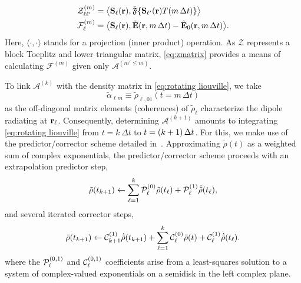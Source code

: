 \begin{subequations}
  \begin{align}
    \mathcal{Z}^{(m)}_{\ell \ell'} &= \big\langle \mathbf{S}_\ell(\vb{r}), \tilde{\mathfrak{F}}\{ \mathbf{S}_{\ell'}(\mathbf{r}) T(m \, \Delta t) \} \big\rangle \\
    \mathcal{F}^{(m)}_\ell &= \big\langle \mathbf{S}_\ell(\vb{r}), \tilde{\mathbf{E}}(\vb{r}, m \, \Delta t) - \tilde{\mathbf{E}}_0(\vb{r}, m \, \Delta t) \big\rangle.
  \end{align}
  \label{eq:projections}
\end{subequations}
Here, $\langle \cdot, \cdot \rangle$ stands for a projection (inner product) operation.
As $\mathcal{Z}$ represents a block Toeplitz and lower triangular matrix, \cref{eq:zmatrix} provides a means of calculating $\mathcal{F}^{(m)}$ given only $\mathcal{A}^{(m' \le m)}$.

To link $\mathcal{A}^{(k)}$ with the density matrix in \cref{eq:rotating liouville}, we take
\begin{equation}
  \tilde{\alpha}_{\ell m} \equiv \tilde{\rho}_{\ell, 01}(t = m \, \Delta t)
  \label{eq:polarization definition}
\end{equation}
as the off-diagonal matrix elements (coherences) of $\tilde{\rho}_{\ell}$ characterize the dipole radiating at $\vb{r}_\ell$.
Consequently, determining $\mathcal{A}^{(k + 1)}$ amounts to integrating \cref{eq:rotating liouville} from $t = k \, \Delta t$ to $t = \qty(k + 1) \, \Delta t$.
For this, we make use of the predictor/corrector scheme detailed in~\cite{Glaser2009}.
Approximating $\tilde{\rho}(t)$ as a weighted sum of complex exponentials, the predictor/corrector scheme proceeds with an extrapolation predictor step,
\begin{equation}
  \tilde{\rho}(t_{k + 1}) \leftarrow \sum_{\ell = 1}^k \mathcal{P}_\ell^{\qty(0)} \tilde{\rho}(t_\ell) + \mathcal{P}_\ell^{\qty(1)} \dot{\tilde{\rho}}(t_\ell),
  \label{eq:predictor}
\end{equation}
and several iterated corrector steps,
\begin{equation}
  \tilde{\rho}(t_{k + 1}) \leftarrow \mathcal{C}_{k+1}^{\qty(1)} \dot{\tilde{\rho}}(t_{k + 1}) + \sum_{\ell = 1}^k \mathcal{C}_\ell^{\qty(0)} \tilde{\rho}(t) + \mathcal{C}_\ell^{\qty(1)} \dot{\tilde{\rho}}(t_\ell).
  \label{eq:corrector}
\end{equation}
where the $\mathcal{P}_\ell^{\qty(0, 1)}$ and $\mathcal{C}_\ell^{\qty(0, 1)}$ coefficients arise from a least-squares solution to a system of complex-valued exponentials on a semidisk in the left complex plane.
